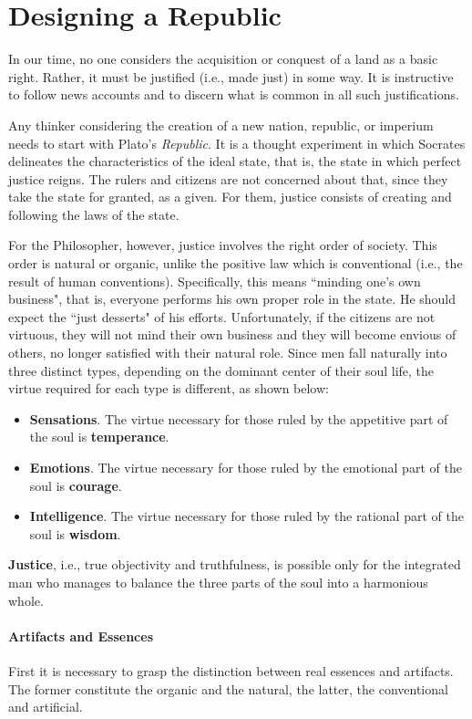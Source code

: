 \section{Designing a Republic}

In our time, no one considers the acquisition or conquest of a land as a basic right. Rather, it must be justified (i.e., made just) in some way. It is instructive to follow news accounts and to discern what is common in all such justifications.

Any thinker considering the creation of a new nation, republic, or imperium needs to start with Plato's \emph{Republic}. It is a thought experiment in which Socrates delineates the characteristics of the ideal state, that is, the state in which perfect justice reigns. The rulers and citizens are not concerned about that, since they take the state for granted, as a given. For them, justice consists of creating and following the laws of the state.

For the Philosopher, however, justice involves the right order of society. This order is natural or organic, unlike the positive law which is conventional (i.e., the result of human conventions). Specifically, this means ``minding one's own business", that is, everyone performs his own proper role in the state. He should expect the ``just desserts" of his efforts. Unfortunately, if the citizens are not virtuous, they will not mind their own business and they will become envious of others, no longer satisfied with their natural role. Since men fall naturally into three distinct types, depending on the dominant center of their soul life, the virtue required for each type is different, as shown below:

\begin{itemize}
\item \textbf{Sensations}. The virtue necessary for those ruled by the appetitive part of the soul is \textbf{temperance}. 
\item \textbf{Emotions}. The virtue necessary for those ruled by the emotional part of the soul is \textbf{courage}. 
\item \textbf{Intelligence}. The virtue necessary for those ruled by the rational part of the soul is \textbf{wisdom}. 
\end{itemize}
\textbf{Justice}, i.e., true objectivity and truthfulness, is possible only for the integrated man who manages to balance the three parts of the soul into a harmonious whole.

\paragraph{Artifacts and Essences}
First it is necessary to grasp the distinction between real essences and artifacts. The former constitute the organic and the natural, the latter, the conventional and artificial.

